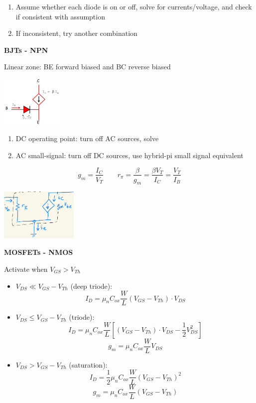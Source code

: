 \documentclass[10pt]{article}
\newcommand{\sqb}[1]{\left[#1\right]}
\newcommand\heading[1]{\textbf{#1}}
\begin{document}
\begin{multicols*}{3}
\begin{enumerate}[topsep=0pt,noitemsep]
    \item Assume whether each diode is on or off, solve for currents/voltage, and check if consistent with assumption
    \item If inconsistent, try another combination
\end{enumerate}

\heading{BJTs - NPN}

Linear zone: BE forward biased and BC reverse biased

\begin{center}
    \includegraphics[width=8em]{images/bjt_diode.png} 
\end{center}

\begin{enumerate}[topsep=0pt,noitemsep]
    \item DC operating point: turn off AC sources, solve
    \item AC small-signal: turn off DC sources, use hybrid-pi small signal equivalent
\end{enumerate}

\[g_m=\frac{I_C}{V_T} \qquad r_\pi = \frac{\beta}{g_m}=\frac{\beta V_T}{I_C}=\frac{V_T}{I_B}\]

\begin{center}
    \includegraphics[width=10em]{images/bjt_hybrid_pi.png}
\end{center}

\heading{MOSFETs - NMOS}

Activate when $V_{GS}>V_{Th}$

\begin{itemize}[topsep=0pt,noitemsep]
    \item $V_{DS}\ll V_{GS}-V_{Th}$ (deep triode):
    \[I_D=\mu_nC_{ox}\frac WL(V_{GS}-V_{Th})\cdot V_{DS}\]
    \item $V_{DS}\le V_{GS}-V_{Th}$ (triode):
    \[I_D=\mu_nC_{ox}\frac WL\sqb{(V_{GS}-V_{Th})\cdot V_{DS}-\frac 12V_{DS}^2}\]
    \[g_m=\mu_nC_{ox}\frac WLV_{DS}\]
    \item $V_{DS}>V_{GS}-V_{Th}$ (saturation):
    \[I_D=\frac 12\mu_nC_{ox}\frac WL(V_{GS}-V_{Th})^2\]
    \[g_m=\mu_nC_{ox}\frac WL(V_{GS}-V_{Th})\]
\end{itemize}


\end{multicols*}
\end{document}

